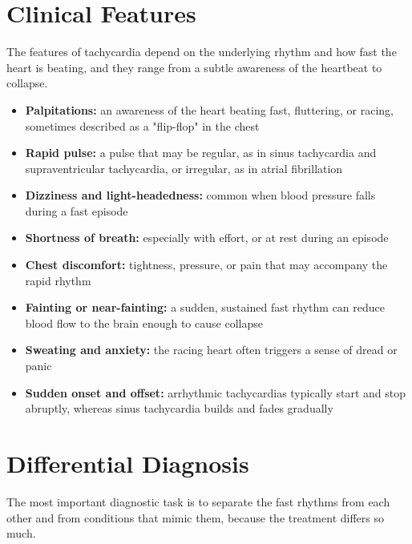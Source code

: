 \section*{Clinical Features}
The features of tachycardia depend on the underlying rhythm and how fast the heart is beating, and they range from a subtle awareness of the heartbeat to collapse.

\begin{itemize}
    \item \textbf{Palpitations:} an awareness of the heart beating fast, fluttering, or racing, sometimes described as a "flip-flop" in the chest
    \item \textbf{Rapid pulse:} a pulse that may be regular, as in sinus tachycardia and supraventricular tachycardia, or irregular, as in atrial fibrillation
    \item \textbf{Dizziness and light-headedness:} common when blood pressure falls during a fast episode
    \item \textbf{Shortness of breath:} especially with effort, or at rest during an episode
    \item \textbf{Chest discomfort:} tightness, pressure, or pain that may accompany the rapid rhythm
    \item \textbf{Fainting or near-fainting:} a sudden, sustained fast rhythm can reduce blood flow to the brain enough to cause collapse
    \item \textbf{Sweating and anxiety:} the racing heart often triggers a sense of dread or panic
    \item \textbf{Sudden onset and offset:} arrhythmic tachycardias typically start and stop abruptly, whereas sinus tachycardia builds and fades gradually
\end{itemize}

\section*{Differential Diagnosis}
The most important diagnostic task is to separate the fast rhythms from each other and from conditions that mimic them, because the treatment differs so much.


